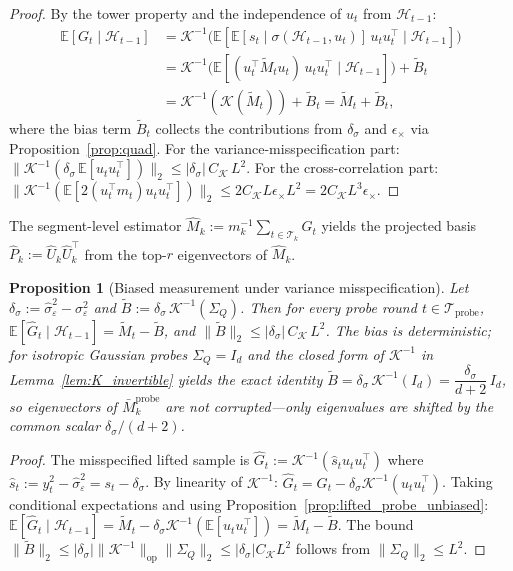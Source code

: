 \documentclass[11pt]{article}
\newcommand{\E}{\mathbb{E}}
\newcommand{\op}{\mathrm{op}}
\newcommand{\cH}{\mathcal{H}}
\newcommand{\cT}{\mathcal{T}}
\newcommand{\cTprobe}{\mathcal{T}_{\mathrm{probe}}}
\newtheorem{proposition}{Proposition}
\begin{document}
\begin{proof}
By the tower property and the independence of $u_t$ from $\cH_{t-1}$:
\begin{align*}
\E[G_t\mid\cH_{t-1}]
&= \mathcal{K}^{-1}\bigl(
   \E[\E[s_t\mid\sigma(\cH_{t-1},u_t)]\,u_tu_t^\top\mid\cH_{t-1}]\bigr)\\
&= \mathcal{K}^{-1}\bigl(
   \E[(u_t^\top\widetilde{M}_t u_t)\,u_tu_t^\top\mid\cH_{t-1}]\bigr)
   + \widetilde{B}_t\\
&= \mathcal{K}^{-1}(\mathcal{K}(\widetilde{M}_t)) + \widetilde{B}_t
 = \widetilde{M}_t + \widetilde{B}_t,
\end{align*}
where the bias term $\widetilde{B}_t$ collects the contributions from
$\delta_\sigma$ and $\epsilon_\times$ via Proposition~\ref{prop:quad}.
For the variance-misspecification part:
$\|\mathcal{K}^{-1}(\delta_\sigma\,\E[u_tu_t^\top])\|_2
\le|\delta_\sigma|\,C_{\mathcal{K}}\,L^2$.
For the cross-correlation part:
$\|\mathcal{K}^{-1}(\E[2(u_t^\top m_t)u_tu_t^\top])\|_2
\le 2C_{\mathcal{K}}L\epsilon_\times L^2
= 2C_{\mathcal{K}}L^3\epsilon_\times$.
\end{proof}

The segment-level estimator
$\widehat{M}_k := m_k^{-1}\sum_{t\in\cT_k}G_t$ yields the projected basis
$\widehat{P}_k := \widehat{U}_k\widehat{U}_k^\top$ from the top-$r$ eigenvectors
of $\widehat{M}_k$.

\begin{proposition}[Biased measurement under variance misspecification]
\label{prop:biased_measurement}
Let $\delta_\sigma := \hat\sigma_\varepsilon^2-\sigma_\varepsilon^2$ and
$\widetilde{B} := \delta_\sigma\,\mathcal{K}^{-1}(\Sigma_Q)$.
Then for every probe round $t\in\cTprobe$,
$\E[\hat{G}_t\mid\cH_{t-1}] = \widetilde{M}_t - \widetilde{B}$,
and $\|\widetilde{B}\|_2\le|\delta_\sigma|\,C_{\mathcal{K}}\,L^2$.
The bias is deterministic; for isotropic Gaussian probes $\Sigma_Q=I_d$ and the
closed form of $\mathcal{K}^{-1}$ in Lemma~\ref{lem:K_invertible} yields the
\emph{exact} identity
$\widetilde{B}=\delta_\sigma\,\mathcal{K}^{-1}(I_d)=\dfrac{\delta_\sigma}{d+2}\,I_d$,
so eigenvectors of $\bar{M}_k^{\mathrm{probe}}$ are not corrupted---only
eigenvalues are shifted by the common scalar $\delta_\sigma/(d+2)$.
\end{proposition}

\begin{proof}
The misspecified lifted sample is
$\hat{G}_t := \mathcal{K}^{-1}(\hat{s}_t u_tu_t^\top)$ where
$\hat{s}_t := y_t^2-\hat\sigma_\varepsilon^2 = s_t-\delta_\sigma$.
By linearity of $\mathcal{K}^{-1}$:
$\hat{G}_t = G_t - \delta_\sigma\mathcal{K}^{-1}(u_tu_t^\top)$.
Taking conditional expectations and using
Proposition~\ref{prop:lifted_probe_unbiased}:
$\E[\hat{G}_t\mid\cH_{t-1}]
= \widetilde{M}_t - \delta_\sigma\mathcal{K}^{-1}(\E[u_tu_t^\top])
= \widetilde{M}_t - \widetilde{B}$.
The bound $\|\widetilde{B}\|_2
\le|\delta_\sigma|\|\mathcal{K}^{-1}\|_{\op}\|\Sigma_Q\|_2
\le|\delta_\sigma|C_{\mathcal{K}}L^2$ follows from $\|\Sigma_Q\|_2\le L^2$.
\end{proof}
\end{document}

